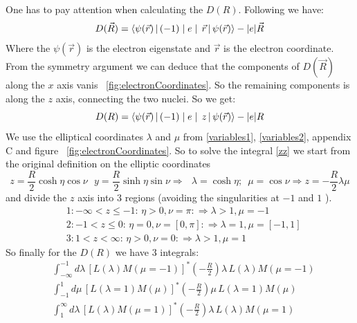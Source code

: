 One has to pay attention when calculating the $ D(R) $. Following \cite{DRZygelman} we have:
\begin{equation}
D(\vec{R}) = \Braket{\psi(\vec{r}) | (-1)\mid e \mid\,\vec{r} | \psi(\vec{r})} - |e|\vec{R}
\end{equation}
Where the $ \psi(\vec{r}) $ is the electron eigenstate and $ \vec{r} $ is the electron coordinate. 
From the symmetry argument we can deduce \cite{DRZygelman} that the components of $ D(\vec{R}) $ along the $ x $ axis vanis ~\ref{fig:electronCoordinates}. So the remaining components is along the
$ z $ axis, connecting the two nuclei. So we get:
\begin{equation}\label{zz}
D(R) = \Braket{\psi(\vec{r}) | (-1)\mid e \mid\,z | \psi(\vec{r})} - |e|R
\end{equation}
We use the elliptical coordinates $ \lambda $ and $ \mu $ from \eqref{variables1}, \eqref{variables2}, appendix C and figure ~\ref{fig:electronCoordinates}.
So to solve the integral \eqref{zz} we start from the original definition on the elliptic coordinates
\begin{equation}
z = \frac{R}{2}\cosh\eta\cos\nu\,\,\,\, y = \frac{R}{2}\sinh\eta\sin\nu  \Rightarrow\,\,\,\,\lambda = \cosh\eta;\,\,\,\mu=\cos\nu  \Rightarrow z=-\frac{R}{2}\lambda\mu
\end{equation}
and divide the $ z $ axis into 3 regions (avoiding the singularities at $ -1 $ and $ 1 $ ).
\begin{equation}
\begin{split}
&1:-\infty < z \le -1:\,\eta > 0,\nu = \pi: \Rightarrow \lambda > 1, \mu = -1 \\[.3em]
&2:-1 < z \le 0:\,\eta = 0,\nu = [0,\pi]: \Rightarrow \lambda = 1, \mu = [-1,1] \\[.3em]
&3:1 < z < \infty:\,\eta > 0,\nu = 0: \Rightarrow \lambda > 1, \mu = 1 
\end{split}
\end{equation}
So finally for the $ D(R) $ we have 3 integrals:
\begin{equation}
\begin{split}
& \int_{-\infty}^{-1}{d\lambda\,\left[L(\lambda)M(\mu=-1)\right]^{*}\left(-\frac{R}{2}\right)\lambda\, L(\lambda)M(\mu=-1)} \\[.5em]
& \int_{-1}^{1}{d\mu\,\left[L(\lambda=1)M(\mu)\right]^{*}\left(-\frac{R}{2}\right)\mu\, L(\lambda=1)M(\mu)} \\[.5em]
& \int_{1}^{\infty}{d\lambda\,\left[L(\lambda)M(\mu=1)\right]^{*}\left(-\frac{R}{2}\right)\lambda\, L(\lambda)M(\mu=1)}
\end{split}
\end{equation}


